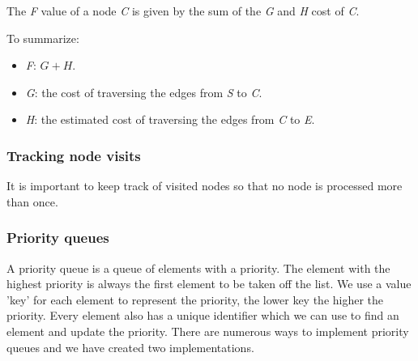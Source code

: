 \documentclass[12pt, a4paper]{article}
\begin{document}
The \textit{F} value of a node \textit{C} is given by the sum of the \textit{G}
and \textit{H} cost of \textit{C}.

To summarize:
\begin{itemize}
	\item \textit{F}: $ G + H $.
	\item \textit{G}: the cost of traversing the edges from \textit{S} to
	\textit{C}.
	\item \textit{H}: the estimated cost of traversing the edges from \textit{C}
	to \textit{E}.
\end{itemize}


\subsubsection{Tracking node visits}
\label{Tracking node visits}

It is important to keep track of visited nodes so that no node is processed more
than once.



\subsubsection{Priority queues}
\label{Priority queues}

A priority queue is a queue of elements with a priority. The element with the highest priority is always the first element to be taken off the list. We use a value 'key'  for each element to represent the priority, the lower key the higher the priority. Every element also has a unique identifier which we can use to find an element and update the priority.  There are numerous ways to implement priority queues and we have created two implementations.
\end{document}
